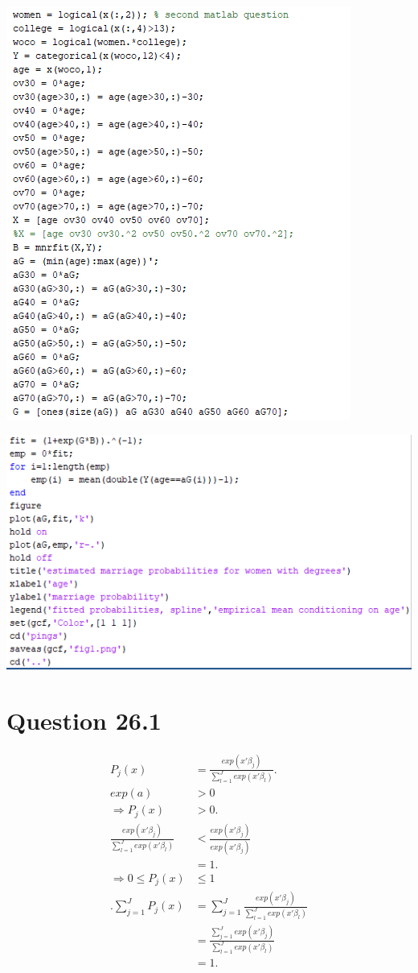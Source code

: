 \documentclass[11pt]{article} %
\begin{document}
\includegraphics{p2}

\includegraphics{p3}

\section{Question 26.1}
\begin{align*}
P_j(x) &= \frac{exp(x'\beta_j)}{\sum_{l=1}^{J}exp(x'\beta_l)}.\\
exp(a) &> 0\\
\Rightarrow P_j(x) &>0.\\
\frac{exp(x'\beta_j)}{\sum_{l=1}^{J}exp(x'\beta_l)} &< \frac{exp(x'\beta_j)}{exp(x'\beta_j)}\\
&= 1.\\
\Rightarrow 0\leq P_j(x)&\leq 1\\.
\sum_{j=1}^J P_j(x) &= \sum_{j=1}^J \frac{exp(x'\beta_j)}{\sum_{l=1}^{J}exp(x'\beta_l)}\\
&= \frac{\sum_{j=1}^{J}exp(x'\beta_j)}{\sum_{l=1}^{J}exp(x'\beta_l)}\\
&=1.
\end{align*}
\end{document}
